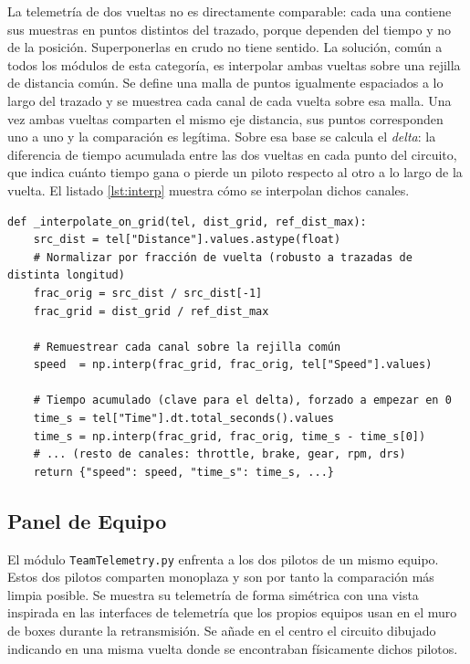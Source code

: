\documentclass[12pt,a4paper,twoside,openright]{book}
\begin{document}
\noindent La telemetría de dos vueltas no es directamente comparable: cada una contiene sus muestras en puntos distintos del trazado, porque dependen del tiempo y no de la posición. Superponerlas en crudo no tiene sentido. La solución, común a todos los módulos de esta categoría, es interpolar ambas vueltas sobre una rejilla de distancia común. Se define una malla de puntos
igualmente espaciados a lo largo del trazado y se muestrea cada canal de cada vuelta sobre esa malla. Una vez ambas vueltas comparten el mismo eje distancia, sus puntos corresponden uno a uno y la comparación es legítima. Sobre esa base se calcula el \textit{delta}: la diferencia de tiempo acumulada entre las dos vueltas en cada punto del circuito, que indica cuánto tiempo gana o pierde un piloto respecto al otro a lo largo de la vuelta.
El listado \ref{lst:interp} muestra cómo se interpolan dichos canales.
\begin{lstlisting}[style=python,caption={Interpolación de una vuelta sobre la rejilla común en \texttt{Ghostcar.py}.},label=lst:interp]
def _interpolate_on_grid(tel, dist_grid, ref_dist_max):
    src_dist = tel["Distance"].values.astype(float)
    # Normalizar por fracción de vuelta (robusto a trazadas de distinta longitud)
    frac_orig = src_dist / src_dist[-1]
    frac_grid = dist_grid / ref_dist_max

    # Remuestrear cada canal sobre la rejilla común
    speed  = np.interp(frac_grid, frac_orig, tel["Speed"].values)

    # Tiempo acumulado (clave para el delta), forzado a empezar en 0
    time_s = tel["Time"].dt.total_seconds().values
    time_s = np.interp(frac_grid, frac_orig, time_s - time_s[0])
    # ... (resto de canales: throttle, brake, gear, rpm, drs)
    return {"speed": speed, "time_s": time_s, ...}
\end{lstlisting}

\subsection{Panel de Equipo}
El módulo \texttt{TeamTelemetry.py} enfrenta a los dos pilotos de un mismo equipo. Estos dos pilotos comparten monoplaza y son por tanto la comparación más limpia posible. Se muestra su telemetría de forma simétrica con una vista inspirada en las interfaces de telemetría que los propios equipos usan en el muro de boxes durante la retransmisión.
Se añade en el centro el circuito dibujado indicando en una misma vuelta donde se encontraban físicamente dichos pilotos.
\end{document}

